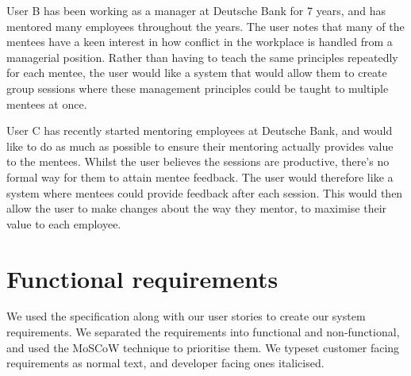 \documentclass[10pt]{article}
\begin{document}
User B has been working as a manager at Deutsche Bank for 7 years, and has
mentored many employees throughout the years. The user notes that many of the
mentees have a keen interest in how conflict in the workplace is handled from a
managerial position. Rather than having to teach the same principles repeatedly
for each mentee, the user would like a system that would allow them to create
group sessions where these management principles could be taught to multiple
mentees at once.

User C has recently started mentoring employees at Deutsche Bank, and would like
to do as much as possible to ensure their mentoring actually provides value to
the mentees. Whilst the user believes the sessions are productive, there's no
formal way for them to attain mentee feedback. The user would therefore like a
system where mentees could provide feedback after each session. This would then
allow the user to make changes about the way they mentor, to maximise their
value to each employee.


\vspace{-4mm}\section{Functional requirements}\vspace{-2mm}
We used the specification along with our user stories to create our system
requirements. We separated the requirements into functional and non-functional,
and used the MoSCoW technique to prioritise them. We typeset customer facing
requirements as normal text, and developer facing ones italicised.
\end{document}
